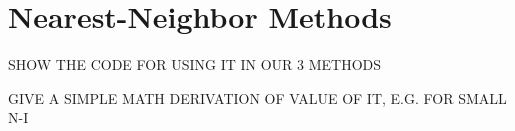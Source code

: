 \chapter{Nearest-Neighbor Methods}  
\label{chap:knn} 

SHOW THE CODE FOR USING IT IN OUR 3 METHODS

GIVE A SIMPLE MATH DERIVATION OF VALUE OF IT, E.G. FOR SMALL N-I

